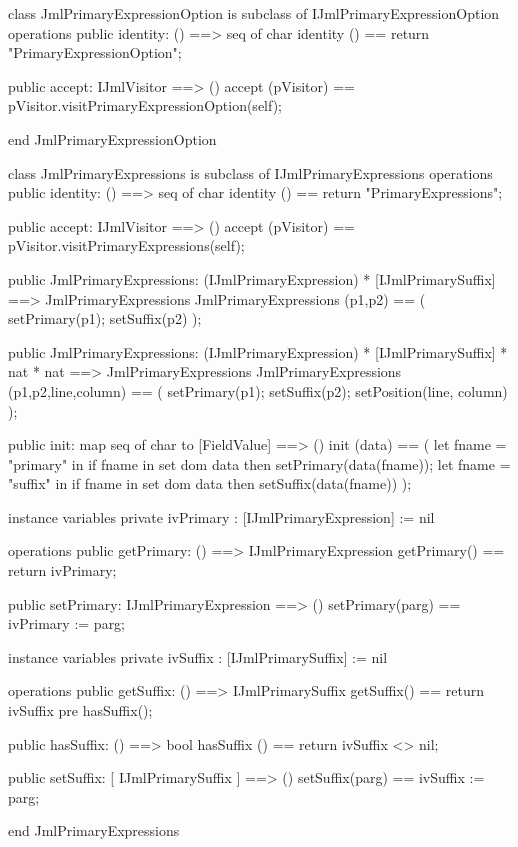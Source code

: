 \begin{vdm_al}
class JmlPrimaryExpressionOption is subclass of IJmlPrimaryExpressionOption
operations
  public identity: () ==> seq of char
  identity () == return "PrimaryExpressionOption";

  public accept: IJmlVisitor ==> ()
  accept (pVisitor) == pVisitor.visitPrimaryExpressionOption(self);

end JmlPrimaryExpressionOption
\end{vdm_al}
\begin{vdm_al}
class JmlPrimaryExpressions is subclass of IJmlPrimaryExpressions
operations
  public identity: () ==> seq of char
  identity () == return "PrimaryExpressions";

  public accept: IJmlVisitor ==> ()
  accept (pVisitor) == pVisitor.visitPrimaryExpressions(self);

  public JmlPrimaryExpressions:
    (IJmlPrimaryExpression) *
    [IJmlPrimarySuffix] ==> JmlPrimaryExpressions
  JmlPrimaryExpressions (p1,p2) == 
    ( setPrimary(p1);
      setSuffix(p2) );

  public JmlPrimaryExpressions:
    (IJmlPrimaryExpression) *
    [IJmlPrimarySuffix] *
    nat *
    nat ==> JmlPrimaryExpressions
  JmlPrimaryExpressions (p1,p2,line,column) == 
    ( setPrimary(p1);
      setSuffix(p2);
      setPosition(line, column) );

  public init: map seq of char to [FieldValue] ==> ()
  init (data) ==
    ( let fname = "primary" in
        if fname in set dom data
        then setPrimary(data(fname));
      let fname = "suffix" in
        if fname in set dom data
        then setSuffix(data(fname)) );

instance variables
  private ivPrimary : [IJmlPrimaryExpression] := nil

operations
  public getPrimary: () ==> IJmlPrimaryExpression
  getPrimary() == return ivPrimary;

  public setPrimary: IJmlPrimaryExpression ==> ()
  setPrimary(parg) == ivPrimary := parg;

instance variables
  private ivSuffix : [IJmlPrimarySuffix] := nil

operations
  public getSuffix: () ==> IJmlPrimarySuffix
  getSuffix() == return ivSuffix
    pre hasSuffix();

  public hasSuffix: () ==> bool
  hasSuffix () == return ivSuffix <> nil;

  public setSuffix: [ IJmlPrimarySuffix ] ==> ()
  setSuffix(parg) == ivSuffix := parg;

end JmlPrimaryExpressions
\end{vdm_al}

